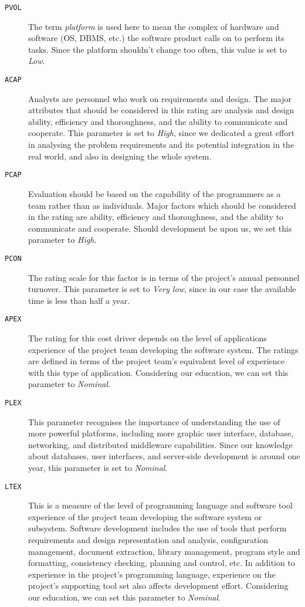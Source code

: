 \begin{description}
	\item [\normalfont\texttt{PVOL}] The term \emph{platform} is used here to mean the complex of hardware and software (OS, DBMS, etc.) the software product calls on to perform its tasks. Since the platform shouldn't change too often, this value is set to \emph{Low}.

	\item [\normalfont\texttt{ACAP}] Analysts are personnel who work on requirements and design. The major attributes that should be considered in this rating are analysis and design ability, efficiency and thoroughness, and the ability to communicate and cooperate. This parameter is set to \emph{High}, since we dedicated a great effort in analysing the problem requirements and its potential integration in the real world, and also in designing the whole system.

	\item [\normalfont\texttt{PCAP}] Evaluation should be based on the capability of the programmers as a team rather than as individuals. Major factors which should be considered in the rating are ability, efficiency and thoroughness, and the ability to communicate and cooperate. Should development be upon us, we set this parameter to \emph{High}.

	\item [\normalfont\texttt{PCON}] The rating scale for this factor is in terms of the project's annual personnel turnover. This parameter is set to \emph{Very low}, since in our case the available time is less than half a year.

	\item [\normalfont\texttt{APEX}] The rating for this cost driver depends on the level of applications experience of the project team developing the software system. The ratings are defined in terms of the project team's equivalent level of experience with this type of application. Considering our education, we can set this parameter to \emph{Nominal}.

	\item [\normalfont\texttt{PLEX}] This parameter recognises the importance of understanding the use of more powerful platforms, including more graphic user interface, database, networking, and distributed middleware capabilities. Since our knowledge about databases, user interfaces, and server-side development is around one year, this parameter is set to \emph{Nominal}.

	\item [\normalfont\texttt{LTEX}] This is a measure of the level of programming language and software tool experience of the project team developing the software system or subsystem. Software development includes the use of tools that perform requirements and design representation and analysis, configuration management, document extraction, library management, program style and formatting, consistency checking, planning and control, etc. In addition to experience in the project's programming language, experience on the project's supporting tool set also affects development effort. Considering our education, we can set this parameter to \emph{Nominal}.


\end{description}
